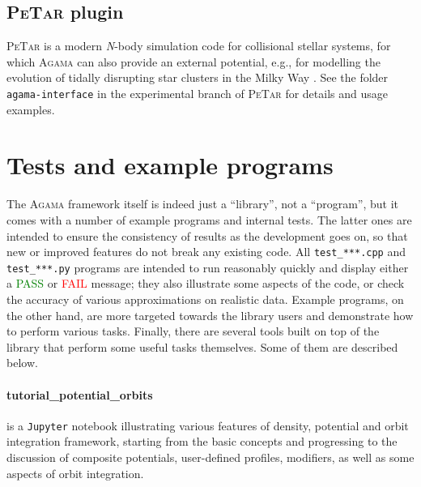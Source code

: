 \documentclass[12pt]{article}
\newcommand{\Agama}{\textsc{Agama}\xspace}
\newcommand{\Nbody}{\textsl{N}-body\xspace}
\let\oldparagraph\paragraph
\renewcommand{\paragraph}[1]{\vspace{-2mm}\oldparagraph{#1}}
\begin{document}
\subsection{\textsc{PeTar} plugin}

\textsc{PeTar} \cite{Wang2020} is a modern \Nbody simulation code for collisional stellar systems, for which \Agama can also provide an external potential, e.g., for modelling the evolution of tidally disrupting star clusters in the Milky Way \cite{He2026}. See the folder \texttt{agama-interface} in the experimental branch of \textsc{PeTar} for details and usage examples.


\section{Tests and example programs}  \label{sec:ExamplesTests}

The \Agama framework itself is indeed just a ``library'', not a ``program'', but it comes with a number of example programs and internal tests. The latter ones are intended to ensure the consistency of results as the development goes on, so that new or improved features do not break any existing code. All \texttt{test_***.cpp} and \texttt{test_***.py} programs are intended to run reasonably quickly and display either a \textcolor{Green}{PASS} or \textcolor{Red}{FAIL} message; they also illustrate some aspects of the code, or check the accuracy of various approximations on realistic data. Example programs, on the other hand, are more targeted towards the library users and demonstrate how to perform various tasks. Finally, there are several tools built on top of the library that perform some useful tasks themselves. Some of them are described below.

\paragraph{tutorial_potential_orbits} is a \texttt{Jupyter} notebook illustrating various features of density, potential and orbit integration framework, starting from the basic concepts and progressing to the discussion of composite potentials, user-defined profiles, modifiers, as well as some aspects of orbit integration.

\end{document}
